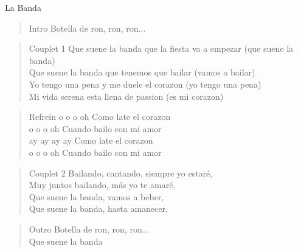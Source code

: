 
\begin{song}[takirari]{La Banda}
\begin{verse}{Intro}
Botella de ron, ron, ron...
\end{verse}

\begin{verse}{Couplet 1}
Que suene la banda que la fiesta va a empezar \hspace{3em}(que suene la banda)\\
Que suene la banda que tenemos que bailar \hspace{3em}(vamos a bailar)\\
Yo tengo una pena y me duele el corazon \hspace{3em}(yo tengo una pena)\\
Mi vida serena esta llena de passion \hspace{3em}(es mi corazon)
\end{verse}

\begin{verse}{Refrein}
o o o oh \hspace{4em} Como late el corazon\\
o o o oh \hspace{4em} Cuando bailo con mi amor\\
\chord{}ay ay ay ay \hspace{2.7em} Como late el corazon\\
o o o oh \hspace{4em} Cuando bailo con mi amor
\end{verse}

\begin{verse}{Couplet 2}
Bailando, cantando, siempre yo estaré‚\\
Muy juntos bailando, más yo te amaré‚\\
Que suene la banda, vamos a beber,\\
Que suene la banda, hasta amanecer.\\
\end{verse}

\begin{verse}{Outro}
Botella de ron, ron, ron...\\
Que suene la banda
\end{verse}

\end{song}

